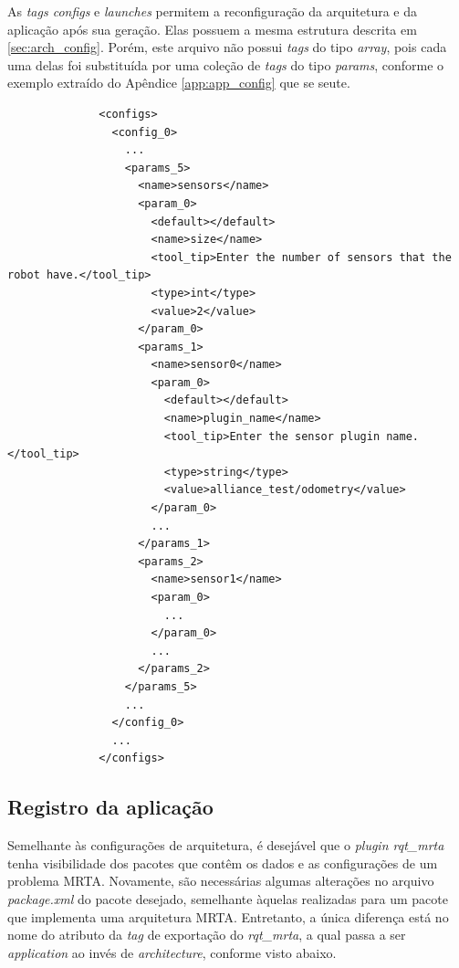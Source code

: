             As \textit{tags configs} e \textit{launches} permitem a reconfiguração da arquitetura e da aplicação após sua geração. Elas possuem a mesma estrutura descrita em \ref{sec:arch_config}. Porém, este arquivo não possui \textit{tags} do tipo \textit{array}, pois cada uma delas foi substituída por uma coleção de \textit{tags} do tipo \textit{params}, conforme o exemplo extraído do Apêndice \ref{app:app_config} que se seute.
            
            \begin{lstlisting}
              <configs>
                <config_0>
                  ...
                  <params_5>
                    <name>sensors</name>
                    <param_0>
                      <default></default>
                      <name>size</name>
                      <tool_tip>Enter the number of sensors that the robot have.</tool_tip>
                      <type>int</type>
                      <value>2</value>
                    </param_0>
                    <params_1>
                      <name>sensor0</name>
                      <param_0>
                        <default></default>
                        <name>plugin_name</name>
                        <tool_tip>Enter the sensor plugin name.</tool_tip>
                        <type>string</type>
                        <value>alliance_test/odometry</value>
                      </param_0>
                      ...
                    </params_1>
                    <params_2>
                      <name>sensor1</name>
                      <param_0>
                        ...
                      </param_0>
                      ...
                    </params_2>
                  </params_5>
                  ...
                </config_0>
                ...
              </configs>
            \end{lstlisting}
            
        \subsection{Registro da aplicação} \label{subsec:app_config_rgst}
            Semelhante às configurações de arquitetura, é desejável que o \textit{plugin rqt\_mrta} tenha visibilidade dos pacotes que contêm os dados e as configurações de um problema MRTA. Novamente, são necessárias algumas alterações no arquivo \textit{package.xml} do pacote desejado, semelhante àquelas realizadas para um pacote que implementa uma arquitetura MRTA. Entretanto, a única diferença está no nome do atributo da \textit{tag} de exportação do \textit{rqt\_mrta}, a qual passa a ser \textit{application} ao invés de \textit{architecture}, conforme visto abaixo.
            
